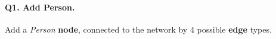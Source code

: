 \paragraph{\textbf{Q1}. Add Person.}
Add a \emph{Person} \textbf{node}, connected to the network by 4
possible \textbf{edge} types.
